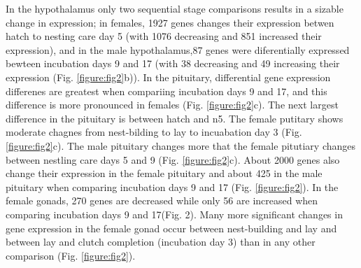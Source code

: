 In the hypothalamus only two sequential stage comparisons results in a
sizable change in expression; in females, 1927 genes changes their
expression betwen hatch to nesting care day 5 (with 1076 decreasing and
851 increased their expression), and in the male hypothalamus,87 genes
were diferentially expressed bewteen incubation days 9 and 17 (with 38
decreasing and 49 increasing their expression (Fig.
\ref{figure:fig2}b)). In the pituitary, differential gene expression
differenes are greatest when compariing incubation days 9 and 17, and
this difference is more pronounced in females (Fig. \ref{figure:fig2}c).
The next largest difference in the pituitary is between hatch and n5.
The female putitary shows moderate chagnes from nest-bilding to lay to
incuabation day 3 (Fig. \ref{figure:fig2}c). The male pituitary changes
more that the female pitutiary changes between nestling care days 5 and
9 (Fig. \ref{figure:fig2}c). About 2000 genes also change their
expression in the female pituitary and about 425 in the male pituitary
when comparing incubation days 9 and 17 (Fig. \ref{figure:fig2}). In the
female gonads, 270 genes are decreased while only 56 are increased when
comparing incubation days 9 and 17(Fig. 2). Many more significant
changes in gene expression in the female gonad occur between
nest-building and lay and between lay and clutch completion (incubation
day 3) than in any other comparison (Fig. \ref{figure:fig2}).

